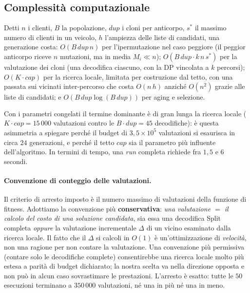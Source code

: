 \documentclass[10pt,a4paper]{article}
\begin{document}
\subsection{Complessità computazionale}
\label{sec:complessita}

Detti $n$ i clienti, $B$ la popolazione, $\mathit{dup}$ i cloni per anticorpo,
$s^{*}$ il massimo numero di clienti in un veicolo, $h$ l'ampiezza delle liste di
candidati, una generazione costa: $O(B\,\mathit{dup}\,n)$ per l'ipermutazione nel
caso peggiore (il peggior anticorpo riceve $n$ mutazioni, ma in media $M_i \ll n$);
$O(B\,\mathit{dup}\cdot k\,n\,s^{*})$ per la valutazione dei cloni (una decodifica
ciascuno, con la DP vincolata a $k$ percorsi); $O(K\cdot\mathit{cap})$ per la
ricerca locale, limitata per costruzione dal tetto, con una passata sui vicinati
inter-percorso che costa $O(n\,h)$ anziché $O(n^2)$ grazie alle liste di candidati;
e $O(B\,\mathit{dup}\log(B\,\mathit{dup}))$ per aging e selezione.

Con i parametri congelati il termine dominante è di gran lunga la ricerca locale
($K\cdot\mathit{cap}=15\,000$ valutazioni contro le $B\cdot\mathit{dup}=45$
decodifiche): è questa asimmetria a spiegare perché il budget di $3{,}5\times10^5$
valutazioni si esaurisca in circa $24$ generazioni, e perché il tetto
$\mathit{cap}$ sia il parametro più influente dell'algoritmo. In termini di tempo,
una \emph{run} completa richiede fra $1{,}5$ e $6$ secondi.

\paragraph{Convenzione di conteggio delle valutazioni.} Il criterio di arresto
imposto è il numero massimo di valutazioni della funzione di fitness. Adottiamo
la convenzione più \textbf{conservativa}: \emph{una valutazione $=$ il calcolo del
costo di una soluzione candidata}, sia essa una decodifica Split completa
\emph{oppure} la valutazione incrementale $\Delta$ di un vicino esaminato dalla
ricerca locale. Il fatto che il $\Delta$ si calcoli in $O(1)$ è un'ottimizzazione
di \emph{velocità}, non una ragione per non contare la valutazione. Una
convenzione più permissiva (contare solo le decodifiche complete) consentirebbe
una ricerca locale molto più estesa a parità di budget dichiarato; la nostra
scelta va nella direzione opposta e non può in alcun caso sovrastimare le
prestazioni. L'arresto è esatto: tutte le $50$ esecuzioni terminano a
$350\,000$ valutazioni, né una in più né una in meno.
\end{document}
